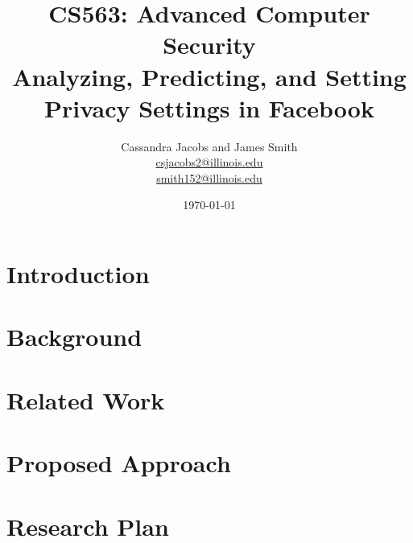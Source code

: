 \documentclass{article}
\title{\vspace{-3.0cm}CS563: Advanced Computer Security \\ Analyzing, Predicting, and Setting Privacy Settings in Facebook}
\author{Cassandra Jacobs and James Smith\\
\href{mailto:csjacobs2@illinois.edu}{csjacobs2@illinois.edu } \\
\href{mailto:smith152@illinois.edu}{smith152@illinois.edu}}
\date{\today}
\begin{document}
\maketitle

\begin{multicols}{2}



\begin{abstract}

\label{abstract}
\end{abstract}


\section{Introduction}

\label{introduction}

\section{Background}

\label{background}

\section{Related Work}

\label{related-work}

\section{Proposed Approach}

\label{proposed-approach}

\section{Research Plan}

\label{proposed-plan}

\printbibliography

\end{multicols}
\end{document}
